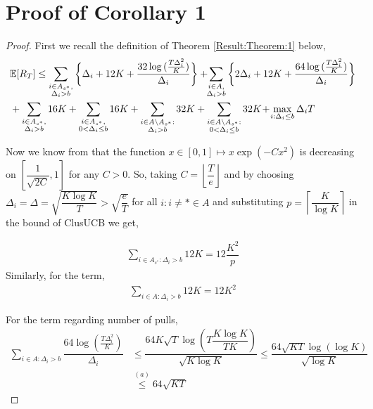 \section{Proof of Corollary 1}
\label{App:Proof:Corollary:1}
\begin{proof}
First we recall the definition of Theorem \ref{Result:Theorem:1} below,
\begin{align*}
&\mathbb{E} [R_{T}]\leq 
\sum\limits_{\substack{i\in A_{s^{*}},\\\Delta_{i} > b}}\bigg\lbrace \Delta_{i} + 12K
+ \frac{32\log{(\frac{T\Delta_i^2}{K})}}{\Delta_{i}} \bigg\rbrace
 + \! \! \sum\limits_{\substack{i\in A,\\\Delta_{i} > b}} \bigg\lbrace 2\Delta_{i} +
12K + \frac{64\log{(\frac{T\Delta_i^2}{K})}}{\Delta_{i}} \bigg\rbrace \\
&+ \sum\limits_{\substack{i\in A_{s^{*}},\\ \Delta_{i} > b}} 
16K+\sum\limits_{\substack{i\in A_{s^{*}},\\0 < \Delta_{i}\leq b}} 16K + \sum_{\substack{i\in A\setminus A_{s^*}:\\\Delta_{i}> b}}32K +\sum_{\substack{i\in A \setminus A_{s^*}:\\ 0 < \Delta_{i} \leq b}}32K 
 \!+\! \max\limits_{i:\Delta_{i}\leq b}\Delta_{i}T
\end{align*}

Now we know from \cite{bubeck2011pure} that the function $x\in [0,1]\mapsto x\exp(-Cx^2)$ is  decreasing on $\left[\dfrac{1}{\sqrt{2C}},1\right ]$ for any $C>0$. So, taking $C=\left\lfloor \dfrac{T}{e}\right\rfloor$ and by choosing  $\Delta_{i}=\Delta=\sqrt{\dfrac{K\log K}{T}}>\sqrt{\dfrac{e}{T}}$ for all ${i:i\neq *}\in A$ and substituting $p=\left\lceil \dfrac{K}{\log K}\right\rceil $ in the bound of ClusUCB we get,

	\begin{align*}
	\sum_{i\in A_{s^{*}}:\Delta_{i} > b} 12K =12\dfrac{K^2}{p}
	\end{align*}		
	 Similarly, for the term, 
	 \begin{align*}
	 \sum_{i\in A:\Delta_{i} > b} 12K = 12 K^2
	 \end{align*}
	 
	
	For the term regarding number of pulls,
	\begin{align*}
	\sum_{i\in A:\Delta_{i} > b}\dfrac{64\log{(\frac{T\Delta_i^2}{K})}}{\Delta_{i}} &\leq  \dfrac{64K\sqrt{T}\log{(T\dfrac{K\log K}{T K})}}{\sqrt{K\log K}} \leq  \dfrac{64\sqrt{KT}\log{(\log K)}}{\sqrt{\log K}}\\
	&\overset{(a)}{\leq} 64\sqrt{KT}
	\end{align*}		
	

\end{proof}
